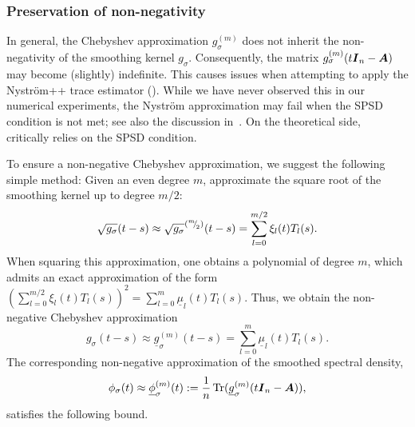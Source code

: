 \subsubsection{Preservation of non-negativity} \label{sec:preservnonneg}

In general, the Chebyshev approximation $g_{\sigma}^{(m)}$ does not inherit the  non-negativity of the smoothing kernel $g_{\sigma}$. Consequently, the matrix $g_{\sigma}^{(m)}(t \boldsymbol{I}_n - \boldsymbol{A})$ may become 
(slightly) indefinite. This causes issues when attempting to apply the Nyström++ trace estimator (). While we have never observed this in our numerical experiments, the Nyström approximation may fail when the SPSD condition is not met; see also the discussion in~\cite{nakatsukasa-2023-randomized-lowrank}. On the theoretical side,~
critically relies on the SPSD condition.

To ensure a non-negative Chebyshev approximation, we suggest the following simple method: Given an even degree $m$, approximate the square root of the smoothing kernel up to degree $m/2$:
\begin{equation}
    \sqrt{g_{\sigma}}(t - s) \approx \sqrt{g_{\sigma}}^{({}^{m}{\mskip -5mu/\mskip -3mu}_{2})}(t - s) = \sum_{l=0}^{m/2} \xi_l(t) T_l(s).
    \label{equ:square-root-chebyshev-approximation}
\end{equation}
When squaring this approximation, one obtains a polynomial of degree $m$, which admits an exact approximation
of the form 
$(\sum_{l=0}^{m/2} \xi_l(t) T_l(s))^2 = \sum_{l=0}^{m} \underline{\mu}_l(t) T_l(s)$.
Thus, we obtain the non-negative Chebyshev approximation
\begin{equation}
g_{\sigma}(t - s) \approx    \underline{g}_{\sigma}^{(m)}(t - s) = \sum_{l=0}^{m} \underline{\mu}_l(t) T_l(s).
    \label{equ:non-negative-chebyshev-approximation}
\end{equation}
The corresponding non-negative approximation of the smoothed spectral density,
\begin{equation}
    \phi_{\sigma}(t) \approx \underline{\phi}_{\sigma}^{(m)}(t) := \frac{1}{n} \operatorname{Tr}(\underline{g}_{\sigma}^{(m)}(t\boldsymbol{I}_n - \boldsymbol{A})),
    \label{equ:non-negative-expanded-density}
\end{equation}
satisfies the following bound.

